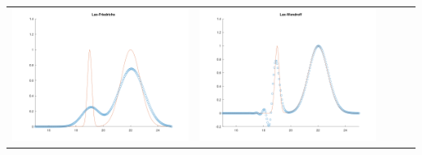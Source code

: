 \documentclass{article}
\begin{document}
\begin{table}
    \centering
        \begin{tabular}{ccccc}
            \includegraphics[scale = 0.17]{LF.png} & \includegraphics[scale = 0.17]{LW.png} \\

\end{tabular}
\end{table}
\end{document}
